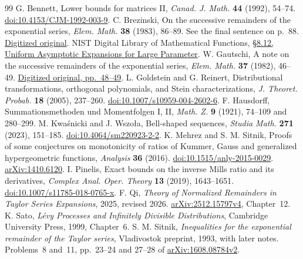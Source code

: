 \documentclass[11pt,a4paper]{article}
\begin{document}
\begin{thebibliography}{99}\small
{} G. Bennett, Lower bounds for matrices II, \emph{Canad. J. Math.} \textbf{44} (1992), 54--74. \href{https://doi.org/10.4153/CJM-1992-003-9}{doi:10.4153/CJM-1992-003-9}.
 C. Brezinski, On the successive remainders of the exponential series, \emph{Elem. Math.} \textbf{38} (1983), 86--89. See the final sentence on p.~88. \href{https://doi.org/10.5169/seals-37189}{Digitized original}.
 NIST Digital Library of Mathematical Functions, \href{https://dlmf.nist.gov/8.12}{\S8.12, Uniform Asymptotic Expansions for Large Parameter}.
 W. Gautschi, A note on the successive remainders of the exponential series, \emph{Elem. Math.} \textbf{37} (1982), 46--49. \href{https://gdz.sub.uni-goettingen.de/download/pdf/PPN378850199_0037/PPN378850199_0037.pdf}{Digitized original, pp.~48--49}.
 L. Goldstein and G. Reinert, Distributional transformations, orthogonal polynomials, and Stein characterizations, \emph{J. Theoret. Probab.} \textbf{18} (2005), 237--260. \href{https://doi.org/10.1007/s10959-004-2602-6}{doi:10.1007/s10959-004-2602-6}.
 F. Hausdorff, Summationsmethoden und Momentfolgen I, II, \emph{Math. Z.} \textbf{9} (1921), 74--109 and 280--299.
 M. Kwa\'snicki and J. Wszo\l a, Bell-shaped sequences, \emph{Studia Math.} \textbf{271} (2023), 151--185. \href{https://doi.org/10.4064/sm220923-2-2}{doi:10.4064/sm220923-2-2}.
 K. Mehrez and S. M. Sitnik, Proofs of some conjectures on monotonicity of ratios of Kummer, Gauss and generalized hypergeometric functions, \emph{Analysis} \textbf{36} (2016). \href{https://doi.org/10.1515/anly-2015-0029}{doi:10.1515/anly-2015-0029}. \href{https://arxiv.org/abs/1410.6120}{arXiv:1410.6120}.
 I. Pinelis, Exact bounds on the inverse Mills ratio and its derivatives, \emph{Complex Anal. Oper. Theory} \textbf{13} (2019), 1643--1651. \href{https://doi.org/10.1007/s11785-018-0765-x}{doi:10.1007/s11785-018-0765-x}.
 F. Qi, \emph{Theory of Normalized Remainders in Taylor Series Expansions}, 2025, revised 2026. \href{https://arxiv.org/abs/2512.15797v4}{arXiv:2512.15797v4}, Chapter~12.
 K. Sato, \emph{L\'evy Processes and Infinitely Divisible Distributions}, Cambridge University Press, 1999, Chapter~6.
 S. M. Sitnik, \emph{Inequalities for the exponential remainder of the Taylor series}, Vladivostok preprint, 1993, with later notes. Problems~8 and~11, pp.~23--24 and 27--28 of \href{https://arxiv.org/pdf/1608.08784v2}{arXiv:1608.08784v2}.

\end{thebibliography}
\end{document}

